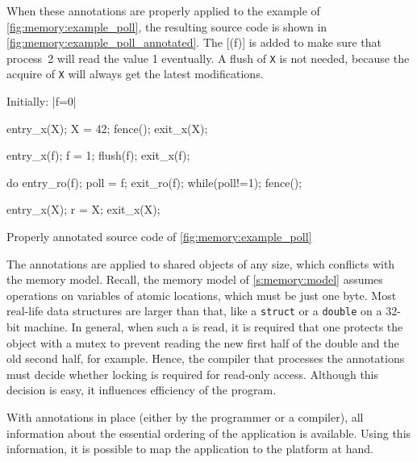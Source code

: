 When these annotations are properly applied to the example of \vref{fig:memory:example_poll}, the resulting source code is shown in \vref{fig:memory:example_poll_annotated}.
The [(f)] is added to make sure that process~2 will read the value 1 eventually.
A flush of \lstinline|X| is not needed, because the acquire of \lstinline|X| will always get the latest modifications.

\begin{parcodes}%
Initially: \lsticode*[variable=f]|f=0|%
\begin{parcode}{.4\linewidth}%
\begin{lstcode}[variable={X,f}]
entry_x(X);
X = 42;
fence();
exit_x(X);

entry_x(f);
f = 1;
flush(f);
exit_x(f);
\end{lstcode}%
\end{parcode}%
\begin{parcode}{.4\linewidth}%
\begin{lstcode}[variable={f,poll,X,r}]
do{
	entry_ro(f);
	poll = f;
	exit_ro(f);
}while(poll!=1);
fence();

entry_x(X);
r = X;
exit_x(X);
\end{lstcode}%
\end{parcode}%
\caption{Properly annotated source code of \vref{fig:memory:example_poll}}%
\label{fig:memory:example_poll_annotated}%
\end{parcodes}

The annotations are applied to shared objects of any size, which conflicts with the memory model.
Recall, the memory model of \cref{s:memory:model} assumes operations on variables of atomic locations, which must be just one byte.
Most real-life data structures are larger than that, like a \lstinline|struct| or a \lstinline|double| on a 32-bit machine.
In general, when such a  is read, it is required that one protects the object with a mutex to prevent reading the new first half of the double and the old second half, for example.
Hence, the compiler that processes the annotations must decide whether locking is required for read-only access.
Although this decision is easy, it influences efficiency of the program.

With annotations in place (either by the programmer or a compiler), all information about the essential ordering of the application is available.
Using this information, it is possible to map the application to the platform at hand.

